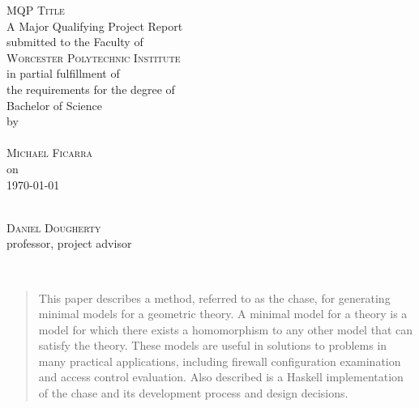 \documentclass[11pt, a4paper]{article}
\begin{document}
\begin{titlepage}
\begin{center}
	\textsc{\huge MQP Title }\\[1cm]
	A Major Qualifying Project Report\\
	submitted to the Faculty of\\[0.7cm]
	\textsc{ \large Worcester Polytechnic Institute }\\[0.7cm]
	in partial fulfillment of\\
	the requirements for the degree of\\
	Bachelor of Science\\[1cm]
	by\\[1cm]
	~\hspace{2cm}\dotfill\hspace{2cm}~\\
	\textsc{\Large Michael Ficarra}\\[1cm]
	on\\[1cm]
	{\Large \today}\\
	\vfill
	\begin{flushright}
		\hspace{8cm}\dotfill \\
		\textsc{Daniel Dougherty}\\
		professor, project advisor\\
	\end{flushright}
\end{center}
\end{titlepage}


~\\
\vfill
\begin{abstract}
This paper describes a method, referred to as the chase, for generating minimal
models for a geometric theory. A minimal model for a theory is a model for
which there exists a homomorphism to any other model that can satisfy the
theory. These models are useful in solutions to problems in many practical
applications, including firewall configuration examination and access control
evaluation. Also described is a Haskell implementation of the chase and its
development process and design decisions.
\end{abstract}
\vfill
~\\
\newpage

\renewcommand{\contentsname}{Table of Contents}
\tableofcontents \newpage
\listoffigures \newpage
\listoftables \newpage

\end{document}
